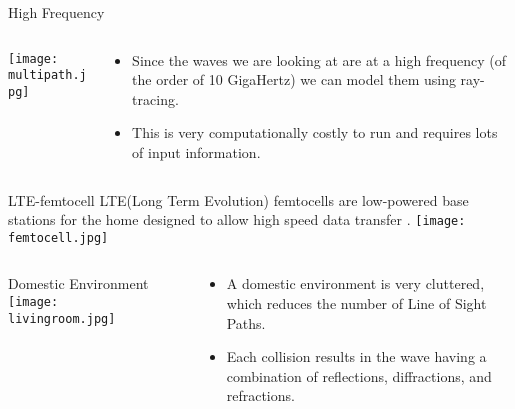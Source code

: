 \documentclass[final]{beamer}
\theoremstyle{plain}
\theoremstyle{definition}
\theoremstyle{remark}
\newlength{\twocolwid}
\begin{document}
\begin{frame}[t]
\begin{columns}[t]
\begin{column}{\twocolwid}
\begin{block}{High Frequency}
\vspace{-2cm}
\begin{columns}
\begin{column}{0.45\linewidth}
\texttt{[image: multipath.jpg]} \cite{Multipath} 
\end{column}
\begin{column}{0.55\linewidth}
\vspace{-1cm}
\begin{itemize}
\item
Since the waves we are looking at are at a high frequency (of the order of 10 GigaHertz)  we can model them using ray-tracing.
\item This is very computationally costly to run and requires lots of input information.
\end{itemize}
\end{column}
\end{columns}
\end{block}

\begin{alertblock}{LTE-femtocell}
LTE(Long Term Evolution) femtocells are low-powered base stations for the home designed to allow high speed data transfer
\cite{LTEfemtocells, zyren2007overview}.
\centering
\center
\texttt{[image: femtocell.jpg]} \cite{femtocells} 
\end{alertblock}
\begin{columns}
\begin{column}{0.45\linewidth}

\begin{block}{Domestic Environment}
\vspace{-1cm}
\texttt{[image: livingroom.jpg]} 
\end{block}

\end{column}
\begin{column}{0.01\linewidth}

\end{column}
\begin{column}{0.45\linewidth}
\vspace{-1.25cm}
\begin{mdframed}[backgroundcolor=white, userdefinedwidth=0.999999\linewidth]
\vspace{0.5cm}
\begin{itemize}
\item A domestic environment is very cluttered, which reduces the number of Line of Sight Paths.
\item Each collision results in the wave having a combination of reflections, diffractions, and refractions. 
\end{itemize}
\vspace{0.5cm}
\end{mdframed}


\end{column}
\end{columns}
\end{column}
\end{columns}
\end{frame}
\end{document}

